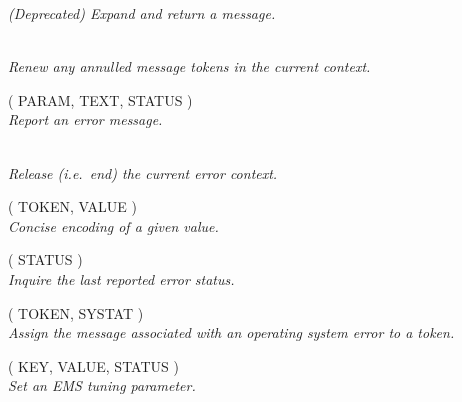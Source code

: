 \documentclass[twoside,11pt]{starlink}
\providecommand{\listline}{\hspace{1pt}\\}
\begin{document}
\begin {description}
\textit{(Deprecated) Expand and return a message. }
\item [\htmlref{EMS\_RENEW}{EMS_RENEW}] \listline
\textit{Renew any annulled message tokens in the current context.}
\item [\htmlref{EMS\_REP}{EMS_REP} ( PARAM, TEXT, STATUS )] \listline
\textit{Report an error message.}
\item [\htmlref{EMS\_RLSE}{EMS_RLSE}] \listline
\textit{Release (i.e.\ end) the current error context.}
\item [\htmlref{EMS\_SETx}{EMS_SETx}  ( TOKEN, VALUE )] \listline
\textit{Concise encoding of a given value. }
\item [\htmlref{EMS\_STAT}{EMS_STAT}  ( STATUS )] \listline
\textit{Inquire the last reported error status.}
\item [\htmlref{EMS\_SYSER}{EMS_SYSER}  ( TOKEN, SYSTAT )] \listline
\textit{Assign the message associated with an operating system error
to a token.}
\item [\htmlref{EMS\_TUNE}{EMS_TUNE} ( KEY, VALUE, STATUS )] \listline
\textit{Set an EMS tuning parameter.}
\end {description}

\newpage
\end{document}
